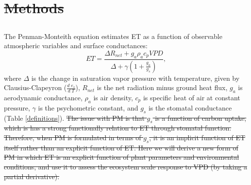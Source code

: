 \documentclass[hess, manuscript]{copernicus}
\providecommand{\DIFaddtex}[1]{{\protect\color{blue}\uwave{#1}}} %
\providecommand{\DIFdeltex}[1]{{\protect\color{red}\sout{#1}}}                      %
\providecommand{\DIFaddbegin}{} %
\providecommand{\DIFaddend}{} %
\providecommand{\DIFdelbegin}{} %
\providecommand{\DIFdelend}{} %
\providecommand{\DIFadd}[1]{\texorpdfstring{\DIFaddtex{#1}}{#1}} %
\providecommand{\DIFdel}[1]{\texorpdfstring{\DIFdeltex{#1}}{}} %
\begin{document}
\DIFdelbegin \section{\DIFdel{Methods}}
\addtocounter{section}{-1}%
\DIFdelend \DIFaddbegin \subsection{\DIFadd{Methods}}
\DIFaddend \label{methods}
The Penman-Monteith equation \citep [hereafter PM,][]{Penman_1948,
  Monteith_1965} estimates ET as a function of observable atmospheric
variables and surface conductances:
  \begin{equation}
    \label{orig_pen}
    ET = \frac{\Delta R_{net} + g_a \rho_a c_p VPD}{\Delta + \gamma(1 + \frac{g_a}{g_s})},
  \end{equation}
where $\Delta$ is the change in saturation vapor pressure with
temperature, given by Clausius-Clapeyron ($\frac{d \; e_s}{d \; T}$),
$R_{net}$ is the net radiation minus ground heat flux, $g_a$ is
aerodynamic conductance, $\rho_a$ is air density, $c_p$ is specific
heat of air at constant pressure, $\gamma$ is the psychometric
constant, and $g_s$ is the stomatal conductance (Table
\ref{definitions}).
\DIFdelbegin \DIFdel{The issue with PM is that
  $g_s$ is a function of carbon uptake, which is has a strong
  functionally relation to ET through stomatal function. Therefore,
  when PM is formulated in terms of $g_s$, it is an implicit function
  of ET itself rather than an explicit function of ET. Here we will
  derive a new form of PM in which ET is an explicit function of plant
  parameters and environmental conditions, and use it to assess the
  ecosystem scale response to VPD (by taking a partial derivative).
}\DIFdelend
\end{document}
